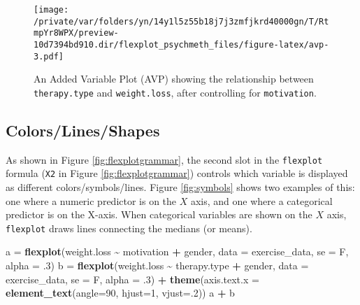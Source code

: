 \documentclass[
  english,
  man]{apa6}
\newenvironment{Shaded}{\begin{snugshade}}{\end{snugshade}}
\newcommand{\DataTypeTok}[1]{\textcolor[rgb]{0.13,0.29,0.53}{#1}}
\newcommand{\DecValTok}[1]{\textcolor[rgb]{0.00,0.00,0.81}{#1}}
\newcommand{\FloatTok}[1]{\textcolor[rgb]{0.00,0.00,0.81}{#1}}
\newcommand{\KeywordTok}[1]{\textcolor[rgb]{0.13,0.29,0.53}{\textbf{#1}}}
\newcommand{\NormalTok}[1]{#1}
\newcommand{\OperatorTok}[1]{\textcolor[rgb]{0.81,0.36,0.00}{\textbf{#1}}}
\newcommand{\StringTok}[1]{\textcolor[rgb]{0.31,0.60,0.02}{#1}}
\begin{document}
\begin{figure}
\centering
\texttt{[image: /private/var/folders/yn/14y1l5z55b18j7j3zmfjkrd40000gn/T/RtmpYr8WPX/preview-10d7394bd910.dir/flexplot\_psychmeth\_files/figure-latex/avp-3.pdf]}
\caption{\label{fig:avp-3}An Added Variable Plot (AVP) showing the relationship between \texttt{therapy.type} and \texttt{weight.loss}, after controlling for \texttt{motivation}. \label{fig:avp}}
\end{figure}

\normalsize

\hypertarget{colorslinesshapes}{%
\subsection{Colors/Lines/Shapes}\label{colorslinesshapes}}

As shown in Figure \ref{fig:flexplotgrammar}, the second slot in the \texttt{flexplot} formula (\texttt{X2} in Figure \ref{fig:flexplotgrammar}) controls which variable is displayed as different colors/symbols/lines. Figure \ref{fig:symbols} shows two examples of this: one where a numeric predictor is on the \(X\) axis, and one where a categorical predictor is on the X-axis. When categorical variables are shown on the \(X\) axis, \texttt{flexplot} draws lines connecting the medians (or means).

\small

\begin{Shaded}
\begin{Highlighting}[]
\NormalTok{a =}\StringTok{ }\KeywordTok{flexplot}\NormalTok{(weight.loss }\OperatorTok{\textasciitilde{}}\StringTok{ }\NormalTok{motivation }\OperatorTok{+}\StringTok{ }\NormalTok{gender, }
    \DataTypeTok{data =}\NormalTok{ exercise\_data, }\DataTypeTok{se =}\NormalTok{ F, }\DataTypeTok{alpha =} \FloatTok{.3}\NormalTok{)}
\NormalTok{b =}\StringTok{ }\KeywordTok{flexplot}\NormalTok{(weight.loss }\OperatorTok{\textasciitilde{}}\StringTok{ }\NormalTok{therapy.type }\OperatorTok{+}\StringTok{ }\NormalTok{gender, }
    \DataTypeTok{data =}\NormalTok{ exercise\_data, }\DataTypeTok{se =}\NormalTok{ F, }\DataTypeTok{alpha =} \FloatTok{.3}\NormalTok{) }\OperatorTok{+}
\StringTok{    }\KeywordTok{theme}\NormalTok{(}\DataTypeTok{axis.text.x =} \KeywordTok{element\_text}\NormalTok{(}\DataTypeTok{angle=}\DecValTok{90}\NormalTok{, }\DataTypeTok{hjust=}\DecValTok{1}\NormalTok{, }\DataTypeTok{vjust=}\NormalTok{.}\DecValTok{2}\NormalTok{))}
\NormalTok{a }\OperatorTok{+}\StringTok{ }\NormalTok{b}
\end{Highlighting}
\end{Shaded}
\end{document}
